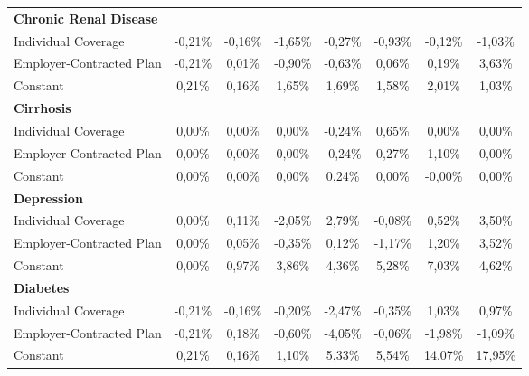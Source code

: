 \documentclass{article}
\begin{document}
\begin{table*}
{\begin{tabular}{l*{7}{c}}
\midrule
\textbf{Chronic Renal Disease}  & & & & & & & \\

Individual Coverage      & -0,21\%         & -0,16\%         & -1,65\%\sym{*}  & -0,27\%         & -0,93\%         & -0,12\%         & -1,03\%         \\
Employer-Contracted Plan & -0,21\%         &  0,01\%         & -0,90\%         & -0,63\%         &  0,06\%         &  0,19\%         & \cellcolor[gray]{0.9}  3,63\%\sym{*}  \\
Constant                 &  0,21\%         &  0,16\%         &  1,65\%\sym{*}  &  1,69\%\sym{*}  &  1,58\%\sym{*}  &  2,01\%\sym{*}  &  1,03\%         \\

\midrule
\textbf{Cirrhosis}  & & & & & & & \\

Individual Coverage      &  0,00\%         &  0,00\%         &  0,00\%         & -0,24\%         &  0,65\%         &  0,00\%\sym{***}&  0,00\%         \\
Employer-Contracted Plan &  0,00\%         &  0,00\%         &  0,00\%         & -0,24\%         &  0,27\%         &  1,10\%         &  0,00\%         \\
Constant                 &  0,00\%         &  0,00\%         &  0,00\%         &  0,24\%         &  0,00\%         & -0,00\%\sym{**} &  0,00\%         \\

\midrule
\textbf{Depression}  & & & & & & & \\

Individual Coverage      &  0,00\%         &  0,11\%         & -2,05\%         &  2,79\%         & -0,08\%         &  0,52\%         &  3,50\%         \\
Employer-Contracted Plan &  0,00\%         &  0,05\%         & -0,35\%         &  0,12\%         & -1,17\%         &  1,20\%         &  3,52\%         \\
Constant                 &  0,00\%         &  0,97\%\sym{*}  &  3,86\%\sym{***}&  4,36\%\sym{***}&  5,28\%\sym{***}&  7,03\%\sym{***}&  4,62\%\sym{**} \\

\midrule
\textbf{Diabetes}  & & & & & & & \\

Individual Coverage      & -0,21\%         & -0,16\%         & -0,20\%         & -2,47\%         & -0,35\%         &  1,03\%         &  0,97\%         \\
Employer-Contracted Plan & -0,21\%         &  0,18\%         & -0,60\%         & -4,05\%\sym{***}& -0,06\%         & -1,98\%         & -1,09\%         \\
Constant                 &  0,21\%         &  0,16\%         &  1,10\%\sym{*}  &  5,33\%\sym{***}&  5,54\%\sym{***}& 14,07\%\sym{***}& 17,95\%\sym{***}\\


\end{tabular}}
\end{table*}
\end{document}
